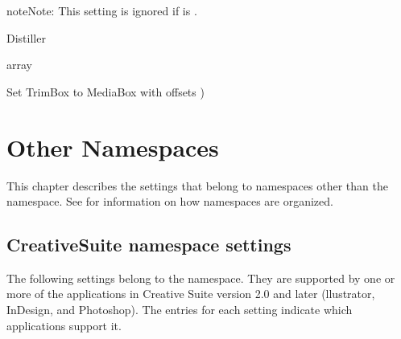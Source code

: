 \documentclass[letterpaper,12pt,english,openany,oneside]{sphinxmanual}
\begin{document}
\begin{sphinxadmonition}{note}{Note:}
This setting is ignored if  is  .
\end{sphinxadmonition}
\label{\detokenize{PDF_Create_CommonSettings:supported-by-120}}

Distiller

\label{\detokenize{PDF_Create_CommonSettings:type-119}}

array

\label{\detokenize{PDF_Create_CommonSettings:ui-name-101}}

Set TrimBox to MediaBox with offsets  )

\label{\detokenize{PDF_Create_CommonSettings:default-value-114}}

\begin{sphinxVerbatim}[commandchars=\\\{\}]
\PYG{p}{[}   \PYG{p}{]}
\end{sphinxVerbatim}


\chapter{Other Namespaces}
\label{\detokenize{PDF_Create_NewNamespaces:other-namespaces}}\label{\detokenize{PDF_Create_NewNamespaces::doc}}
This chapter describes the settings that belong to namespaces other than the  namespace. See  for information on how namespaces are organized.




\section{CreativeSuite namespace settings}
\label{\detokenize{PDF_Create_NewNamespaces:creativesuite-namespace-settings}}
The following settings belong to the  namespace. They are supported by one or more of the applications in Creative Suite version 2.0 and later (llustrator, InDesign, and Photoshop). The entries for each setting indicate which applications support it.
\end{document}
